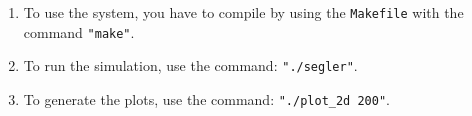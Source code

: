 \documentclass[12pt,a4paper]{article}
\begin{document}
\vspace{0.1cm}

\begin{enumerate}[label=\roman*.]
    \item 
    To use the system, you have to compile by using the \texttt{Makefile} with the command \texttt{"make"}.
    \newline
    \vspace{0.1 cm}

    \item 
    To run the simulation, use the command: \texttt{"./segler"}.
    \newline
    \vspace{0.1 cm}

    \item 
    To generate the plots, use the command: \texttt{"./plot\_2d 200"}.
\end{enumerate}

\vspace{0.5cm}
\end{document}
